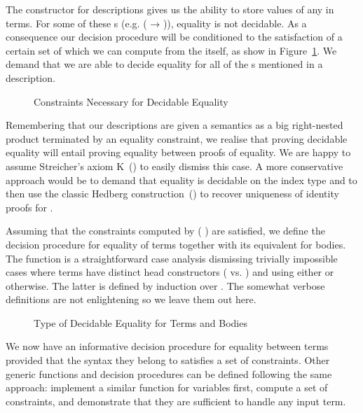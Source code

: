 The constructor  for descriptions gives us the ability to store
values of any  in terms. For some of these s (e.g.
{( → )}), equality is not decidable. As a consequence
our decision procedure will be conditioned to the satisfaction of a
certain set of  which we can compute from the 
itself, as show in Figure~\ref{fig:eqconstraints}. We demand that we are
able to decide equality for all of the s mentioned in a description.

\begin{figure}[h]
\caption{Constraints Necessary for Decidable Equality}\label{fig:eqconstraints}
\end{figure}

Remembering that our descriptions are given a semantics as a big right-nested
product terminated by an equality constraint, we realise that proving decidable
equality will entail proving equality between proofs of equality. We are happy
to assume Streicher's axiom K~(\cite{DBLP:conf/lics/HofmannS94}) to easily
dismiss this case. A more conservative approach would be to demand that equality
is decidable on the index type  and to then use the classic Hedberg
construction~(\citeyear{DBLP:journals/jfp/Hedberg98}) to recover uniqueness of
identity proofs for .

Assuming that the constraints computed by {( )} are
satisfied, we define the decision procedure for equality of terms together
with its equivalent for bodies. The function 
is a straightforward case analysis dismissing trivially impossible cases
where terms have distinct head constructors ( vs. )
and using either  or 
otherwise. The latter is defined by induction over . The somewhat
verbose definitions are not enlightening so we leave them out here.

\begin{figure}[h]
\caption{Type of Decidable Equality for Terms and Bodies}\label{fig:eqtype}
\end{figure}

We now have an informative decision procedure for equality between terms
provided that the syntax they belong to satisfies a set of constraints.
Other generic functions and decision procedures can be defined
following the same approach: implement a similar function for variables
first, compute a set of constraints, and demonstrate that they are
sufficient to handle any input term.
